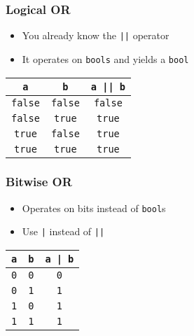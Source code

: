 \begin{frame}
  \frametitle{Logical OR}
  \begin{itemize}
    \item You already know the \texttt{||} operator
    \item It operates on \texttt{bools} and yields a \texttt{bool}
  \end{itemize}
  \begin{center}
    \begin{tabular}{ccc}
      \toprule
      \texttt{a} & \texttt{b} & \texttt{a || b} \\
      \midrule
      \texttt{false} & \texttt{false} & \texttt{false} \\
      \texttt{false} & \texttt{true} & \texttt{true} \\
      \texttt{true} & \texttt{false} & \texttt{true} \\
      \texttt{true} & \texttt{true} & \texttt{true} \\
      \bottomrule
    \end{tabular}
  \end{center}
\end{frame}

\begin{frame}
  \frametitle{Bitwise OR}
  \begin{itemize}
    \item Operates on bits instead of \texttt{bool}s
    \item Use \texttt{|} instead of \texttt{||}
  \end{itemize}
  \begin{center}
    \begin{tabular}{ccc}
      \toprule
      \texttt{a} & \texttt{b} & \texttt{a | b} \\
      \midrule
      \texttt{0} & \texttt{0} & \texttt{0} \\
      \texttt{0} & \texttt{1} & \texttt{1} \\
      \texttt{1} & \texttt{0} & \texttt{1} \\
      \texttt{1} & \texttt{1} & \texttt{1} \\
      \bottomrule
    \end{tabular}
  \end{center}
\end{frame}


